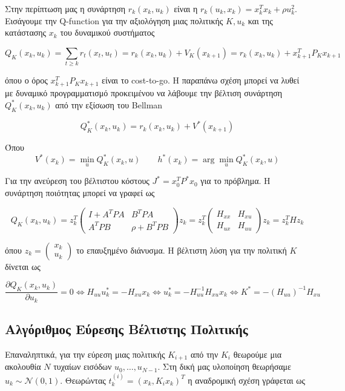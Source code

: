 \documentclass[a4paper,oneside,12pt]{article}
\begin{document}
Στην περίπτωση μας η συνάρτηση $r_k(x_k, u_k)$ είναι η $r_k(u_k, x_k) = x_k^Tx_k + \rho u_k^2$. Εισάγουμε την Q-function για την αξιολόγηση μιας πολιτικής $K, u_k$ και της κατάστασης $x_k$ του δυναμικού συστήματος 

\begin{equation}
Q_K(x_k, u_k) = \sum_{t \ge k} r_t(x_t, u_t) = r_k(x_k, u_k) + V_K(x_{k+1}) = r_k(x_k, u_k) + x_{k+1}^TP_Kx_{k+1}
\end{equation}

όπου ο όρος $x_{k+1}^T P_K x_{k+1}$ είναι το cost-to-go. Η παραπάνω σχέση μπορεί να λυθεί με δυναμικό προγραμματισμό προκειμένου να λάβουμε την βέλτιση συνάρτηση $Q^*_K(x_k, u_k)$ από την εξίσωση του Bellman

$$Q_K^*(x_k, u_k) = r_k(x_k, u_k) + V^*(x_{k+1})$$

Όπου $$V^*(x_k) = \min_{u} Q^*_K(x_k, u) \qquad h^*(x_k) = \arg \min_u Q^*_K(x_k, u)$$ 

Για την ανεύρεση του βέλτιστου κόστους $J^* = x_0^TP^*x_0$ για το πρόβλημα. Η συνάρτηση ποιότητας μπορεί να γραφεί ως

$$Q_K(x_k, u_k) = z_k^T\begin{pmatrix}
	I + A^TPA & B^T P A \\
	A^TPB & \rho + B^T P B 
\end{pmatrix}z_k = z_k^T\begin{pmatrix}
	H_{xx} & H_{xu} \\
	H_{ux} & H_{uu}

\end{pmatrix} z_k = z_k^T H z_k$$

όπου $z_k = \begin{pmatrix} x_k \\ u_k \end{pmatrix}$ το επαυξημένο διάνυσμα. Η βέλτιστη λύση για την πολιτική $K$ δίνεται ως

$$\frac {\partial Q_K(x_k, u_k)} {\partial u_k} = 0 \iff H_{uu} u_k^* = - H_{xu} x_k \iff u_k^* = - H_{uu}^{-1} H_{xu} x_k\iff K^* = - (H_{uu})^{-1} H_{xu}$$

\subsection{Αλγόριθμος Εύρεσης Βέλτιστης Πολιτικής}

Επαναληπτικά, για την εύρεση μιας πολιτικής $K_{i+1}$ από την $K_i$ θεωρούμε μια ακολουθία $N$ τυχαίων εισόδων $u_0, \dots, u_{N - 1}$. Στη δική μας υλοποίηση θεωρήσαμε $u_k \sim \mathcal N (0, 1)$. Θεωρώντας $t_{k}^{(i)} = (x_k, K_ix_k)^T$ η αναδρομική σχέση γράφεται ως 
\end{document}

